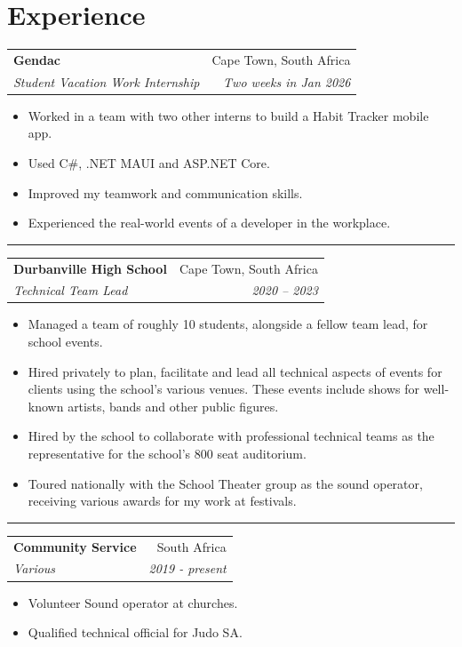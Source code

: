 \documentclass[11pt,a4paper]{article}
\makeatletter
\newcommand{\cvEntry}[4]{
  \noindent\vspace{2pt}\begin{tabular*}{1\textwidth}[t]{l@{\extracolsep{\fill}}r}
    \textbf{#1} & #2 \\
    \textit{\small#3} & \textit{\small #4} \\
  \end{tabular*}\vspace{0pt}
}
\makeatother
\begin{document}
\section{Experience}
  \cvEntry
    {Gendac}{Cape Town, South Africa}
    {Student Vacation Work Internship}{Two weeks in Jan 2026}
    \begin{itemize}[leftmargin=2em, noitemsep]
      \small
      \item Worked in a team with two other interns to build a Habit Tracker mobile app.
      \item Used C\#, .NET MAUI and ASP.NET Core.
      \item Improved my teamwork and communication skills.
      \item Experienced the real-world events of a developer in the workplace.
    \end{itemize}

  \vspace{5px} \hrule \vspace{5px}

  \cvEntry
    {Durbanville High School}{Cape Town, South Africa}
    {Technical Team Lead}{2020 -- 2023}
    \begin{itemize}[leftmargin=2em, noitemsep]
      \small
      \item Managed a team of roughly 10 students, alongside a fellow team lead, for school events.
      \item Hired privately to plan, facilitate and lead all technical aspects of events for clients
            using the school's various venues. These events include shows for well-known artists, bands and other public figures.
      \item Hired by the school to collaborate with professional technical teams as the representative for the school's 800 seat auditorium.
      \item Toured nationally with the School Theater group as the sound operator, receiving various awards for my work at festivals.  
    \end{itemize}

  \vspace{5px} \hrule \vspace{5px}

  \cvEntry
    {Community Service}{South Africa}
    {Various}{2019 - present}
    \begin{itemize}[leftmargin=0.15in, noitemsep]
      \small
      \item Volunteer Sound operator at churches.
      \item Qualified technical official for Judo SA.
    \end{itemize}
\end{document}
